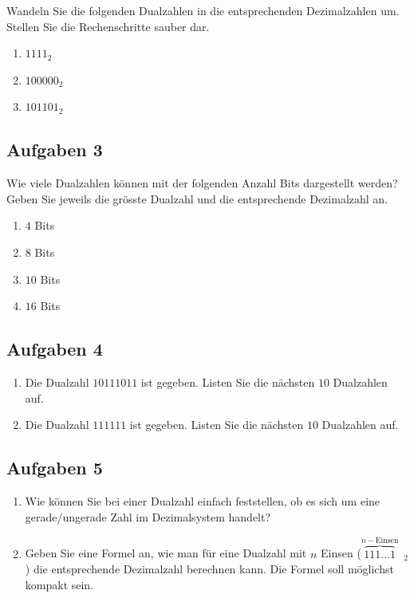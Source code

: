 Wandeln Sie die folgenden Dualzahlen in die entsprechenden Dezimalzahlen um. Stellen Sie die Rechenschritte sauber dar.

\begin{enumerate}
\item $1111_2$
\fillwithgrid{1.5in}
\item $100000_2$
\fillwithgrid{1.5in}
\item $101101_2$
\fillwithgrid{1.5in}
\end{enumerate}

\subsection{Aufgaben 3}

Wie viele Dualzahlen können mit der folgenden Anzahl Bits dargestellt werden? Geben Sie jeweils die grösste Dualzahl und die entsprechende Dezimalzahl an.

\begin{enumerate}
\item $4$ Bits
\fillwithgrid{0.75in}
\item $8$ Bits
\fillwithgrid{0.75in}
\item $10$ Bits
\fillwithgrid{0.75in}
\item $16$ Bits
\fillwithgrid{0.75in}
\end{enumerate}

\subsection{Aufgaben 4}

\begin{enumerate}
\item Die Dualzahl $10111011$ ist gegeben. Listen Sie die nächsten $10$ Dualzahlen auf.
\fillwithgrid{1.5in}
\item Die Dualzahl $111111$ ist gegeben. Listen Sie die nächsten $10$ Dualzahlen auf.
\fillwithgrid{1.5in}
\end{enumerate}

\subsection{Aufgaben 5}

\begin{enumerate}
\item Wie können Sie bei einer Dualzahl einfach feststellen, ob es sich um eine gerade/ungerade Zahl im Dezimalsystem handelt?
\fillwithgrid{0.75in}
\item Geben Sie eine Formel an, wie man für eine Dualzahl mit $n$ Einsen ($\overbrace{111\dots1}^{n-\textrm{Einsen}}$~$_2$) die entsprechende Dezimalzahl berechnen kann. Die Formel soll möglichst kompakt sein.
\fillwithgrid{1.5in}
\end{enumerate}
